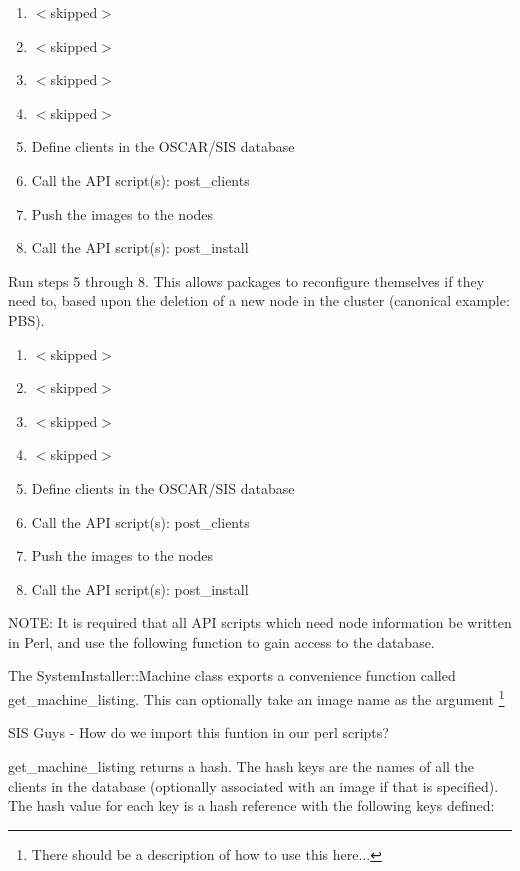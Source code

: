 \begin{enumerate}
\item $<$skipped$>$
\item $<$skipped$>$
\item $<$skipped$>$
\item $<$skipped$>$
\item Define clients in the OSCAR/SIS database
\item Call the API script(s): post\_clients
\item Push the images to the nodes
\item Call the API script(s): post\_install
\end{enumerate}



Run steps 5 through 8.  This allows packages to reconfigure themselves
if they need to, based upon the deletion of a new node in the cluster
(canonical example: PBS).

\begin{enumerate}
\item $<$skipped$>$
\item $<$skipped$>$
\item $<$skipped$>$
\item $<$skipped$>$
\item Define clients in the OSCAR/SIS database
\item Call the API script(s): post\_clients
\item Push the images to the nodes
\item Call the API script(s): post\_install
\end{enumerate}



NOTE: It is required that all API scripts which need node information be
written in Perl, and use the following function to gain access to the
database.

The SystemInstaller::Machine class exports a convenience function
called get\_machine\_listing.  This can optionally take an image name as
the argument \footnote{There should be a description of how to use
this here...}

\begin{discuss}
SIS Guys - How do we import this funtion in our perl scripts?
\end{discuss}

get\_machine\_listing returns a hash.  The hash keys are the names of
all the clients in the database (optionally associated with an image
if that is specified).  The hash value for each key is a hash
reference with the following keys defined:

